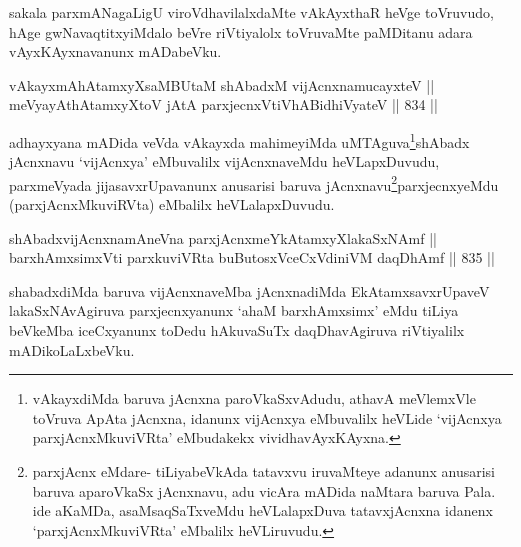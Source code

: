 \begin{artha}
sakala parxmANagaLigU viroVdhavilalxdaMte vAkAyxthaR heVge toVruvudo, hAge gwNavaqtitxyiMdalo beVre riVtiyalolx toVruvaMte paMDitanu adara vAyxKAyxnavanunx mADabeVku.
\end{artha}


\begin{shl}
vAkayxmAhAtamxyXsaMBUtaM shAbadxM vijAcnxnamucayxteV || \\
meVyayAthAtamxyXtoV jAtA parxjecnxVtiVhABidhiVyateV \hfill || 834 ||  
\end{shl}

\begin{artha}
adhayxyana mADida veVda vAkayxda mahimeyiMda uMTAguva\footnote{vAkayxdiMda baruva jAcnxna paroVkaSxvAdudu, athavA meVlemxVle toVruva ApAta jAcnxna, idanunx vijAcnxya eMbuvalilx heVLide `vijAcnxya parxjAcnxMkuviVRta' eMbudakekx vividhavAyxKAyxna.}shAbadx jAcnxnavu `vijAcnxya' eMbuvalilx vijAcnxnaveMdu heVLapxDuvudu, parxmeVyada jijasavxrUpavanunx anusarisi baruva jAcnxnavu\footnote{parxjAcnx eMdare- tiLiyabeVkAda tatavxvu iruvaMteye adanunx anusarisi baruva aparoVkaSx jAcnxnavu, adu vicAra mADida naMtara baruva Pala. ide aKaMDa, asaMsaqSaTxveMdu heVLalapxDuva tatavxjAcnxna idanenx `parxjAcnxMkuviVRta' eMbalilx heVLiruvudu.}parxjecnxyeMdu (parxjAcnxMkuviRVta) eMbalilx heVLalapxDuvudu.
\end{artha}


\begin{shl}
shAbadxvijAcnxnamAneVna parxjAcnxmeYkAtamxyXlakaSxNAmf || \\
barxhAmxsimxVti parxkuviVRta buButosxVceCxVdiniVM daqDhAmf \hfill || 835 ||  
\end{shl}

\begin{artha}
shabadxdiMda baruva vijAcnxnaveMba jAcnxnadiMda EkAtamxsavxrUpaveV lakaSxNAvAgiruva parxjecnxyanunx `ahaM barxhAmxsimx' eMdu tiLiya beVkeMba iceCxyanunx toDedu hAkuvaSuTx daqDhavAgiruva riVtiyalilx mADikoLaLxbeVku.
\end{artha}



